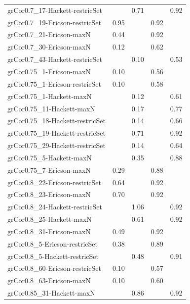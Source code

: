 \begin{footnotesize}
\begin{longtable}{@{}lrrrr@{}}
grCor0.7\_17-Hackett-restricSet &  & 0.71 &  & 0.92\tabularnewline
grCor0.7\_19-Ericson-restricSet & 0.95 &  & 0.92 & \tabularnewline
grCor0.7\_21-Ericson-maxN & 0.44 &  & 0.92 & \tabularnewline
grCor0.7\_30-Ericson-maxN & 0.12 &  & 0.62 & \tabularnewline
grCor0.7\_43-Hackett-restricSet &  & 0.10 &  & 0.53\tabularnewline
grCor0.75\_1-Ericson-maxN & 0.10 &  & 0.56 & \tabularnewline
grCor0.75\_1-Ericson-restricSet & 0.10 &  & 0.58 & \tabularnewline
grCor0.75\_1-Hackett-maxN &  & 0.12 &  & 0.61\tabularnewline
grCor0.75\_11-Hackett-maxN &  & 0.17 &  & 0.77\tabularnewline
grCor0.75\_18-Hackett-restricSet &  & 0.14 &  & 0.66\tabularnewline
grCor0.75\_19-Hackett-restricSet &  & 0.71 &  & 0.92\tabularnewline
grCor0.75\_29-Hackett-restricSet &  & 0.14 &  & 0.64\tabularnewline
grCor0.75\_5-Hackett-maxN &  & 0.35 &  & 0.88\tabularnewline
grCor0.75\_7-Ericson-maxN & 0.29 &  & 0.88 & \tabularnewline
grCor0.8\_22-Ericson-restricSet & 0.64 &  & 0.92 & \tabularnewline
grCor0.8\_23-Ericson-maxN & 0.70 &  & 0.92 & \tabularnewline
grCor0.8\_24-Hackett-restricSet &  & 1.06 &  & 0.92\tabularnewline
grCor0.8\_25-Hackett-maxN &  & 0.61 &  & 0.92\tabularnewline
grCor0.8\_31-Ericson-maxN & 0.49 &  & 0.92 & \tabularnewline
grCor0.8\_5-Ericson-restricSet & 0.38 &  & 0.89 & \tabularnewline
grCor0.8\_5-Hackett-restricSet &  & 0.48 &  & 0.91\tabularnewline
grCor0.8\_60-Ericson-restricSet & 0.10 &  & 0.57 & \tabularnewline
grCor0.8\_63-Ericson-maxN & 0.10 &  & 0.60 & \tabularnewline
grCor0.85\_31-Hackett-maxN &  & 0.86 &  & 0.92\tabularnewline
\bottomrule
\end{longtable}
\end{footnotesize}
\clearpage%


